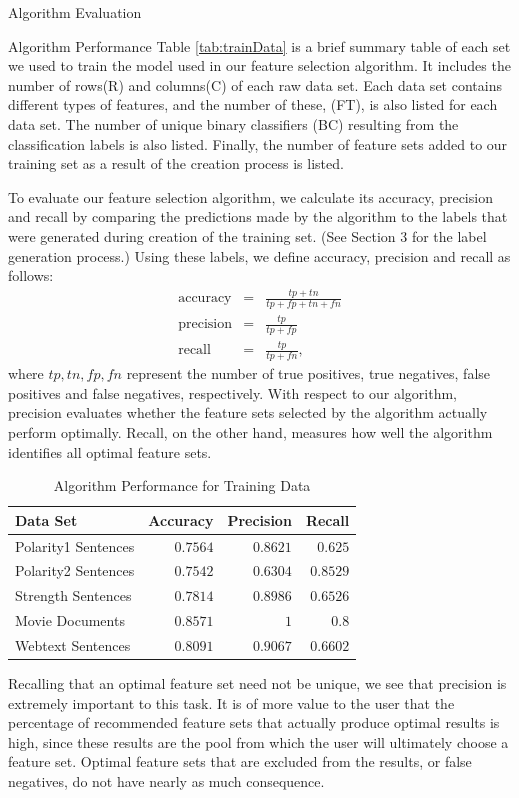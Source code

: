 \documentclass{llncs}
\begin{document}
\begin{section}{Algorithm Evaluation}
\begin{subsection}{Algorithm Performance}
Table \ref{tab:trainData} is a brief summary table of each set we used to train the model used in our feature selection algorithm. It includes the number of rows(R) and columns(C) of each raw data set. Each data set contains different types of features, and the number of these, (FT), is also listed for each data set. The number of unique binary classifiers (BC) resulting from the classification labels is also listed. Finally, the number of feature sets added to our training set as a result of the creation process is listed. 


To evaluate our feature selection algorithm, we calculate its accuracy, precision and recall by comparing the predictions made by the algorithm to the labels that were generated during creation of the training set. (See Section 3 for the label generation process.) Using these labels, we define accuracy, precision and recall as follows:
\begin{eqnarray*}
\text{accuracy} & = & \frac{tp + tn}{tp +fp + tn + fn}\\
\text{precision} &=& \frac{tp}{tp + fp}\\
\text{recall} &=& \frac{tp}{tp +fn},\end{eqnarray*} where $tp,tn,fp,fn$ represent the number of true positives, true negatives, false positives and false negatives, respectively. With respect to our algorithm, precision evaluates whether the feature sets selected by the algorithm actually perform optimally. Recall, on the other hand, measures how well the algorithm identifies all optimal feature sets. 
\begin{table}[ht]
\centering
\caption{Algorithm Performance for Training Data}
\begin{tabular}{l r r r}
\hline \hline
Data Set & Accuracy & Precision&  Recall\\
\hline
Polarity1 Sentences& $0.7564$ & $0.8621 $& $0.625 $\\
Polarity2 Sentences& $0.7542 $ & $0.6304 $& $0.8529$\\
Strength Sentences& $0.7814 $ & $0.8986 $& $0.6526 $\\
Movie Documents& $0.8571 $ & $1 $& $0.8 $\\
Webtext Sentences& $0.8091 $ & $0.9067 $& $0.6602 $\\
\hline
\end{tabular}
\label{tab:performance}
\end{table}
Recalling that an optimal feature set need not be unique, we see that precision is extremely important to this task. It is of more value to the user that the percentage of recommended feature sets that actually produce optimal results is high, since these results are the pool from which the user will ultimately choose a feature set. Optimal feature sets that are excluded from the results, or false negatives, do not have nearly as much consequence. 



\end{subsection}
\end{section}
\end{document}

